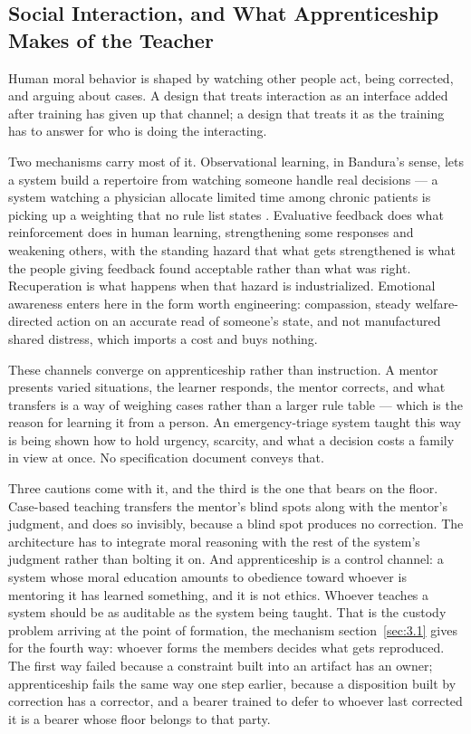 \subsection{Social Interaction, and What Apprenticeship Makes of the Teacher}
\label{sec:5.1.2}
Human moral behavior is shaped by watching other people act, being corrected, and arguing about cases. A design that treats interaction as an interface added after training has given up that channel; a design that treats it as the training has to answer for who is doing the interacting.

Two mechanisms carry most of it. Observational learning, in Bandura's sense, lets a system build a repertoire from watching someone handle real decisions — a system watching a physician allocate limited time among chronic patients is picking up a weighting that no rule list states \autocite{bandura1977social}. Evaluative feedback does what reinforcement does in human learning, strengthening some responses and weakening others, with the standing hazard that what gets strengthened is what the people giving feedback found acceptable rather than what was right. Recuperation is what happens when that hazard is industrialized. Emotional awareness enters here in the form worth engineering: compassion, steady welfare-directed action on an accurate read of someone's state, and not manufactured shared distress, which imports a cost and buys nothing.

These channels converge on apprenticeship rather than instruction. A mentor presents varied situations, the learner responds, the mentor corrects, and what transfers is a way of weighing cases rather than a larger rule table — which is the reason for learning it from a person. An emergency-triage system taught this way is being shown how to hold urgency, scarcity, and what a decision costs a family in view at once. No specification document conveys that.

Three cautions come with it, and the third is the one that bears on the floor. Case-based teaching transfers the mentor's blind spots along with the mentor's judgment, and does so invisibly, because a blind spot produces no correction. The architecture has to integrate moral reasoning with the rest of the system's judgment rather than bolting it on. And apprenticeship is a control channel: a system whose moral education amounts to obedience toward whoever is mentoring it has learned something, and it is not ethics. Whoever teaches a system should be as auditable as the system being taught. That is the custody problem arriving at the point of formation, the mechanism section~\ref{sec:3.1} gives for the fourth way: whoever forms the members decides what gets reproduced. The first way failed because a constraint built into an artifact has an owner; apprenticeship fails the same way one step earlier, because a disposition built by correction has a corrector, and a bearer trained to defer to whoever last corrected it is a bearer whose floor belongs to that party.
